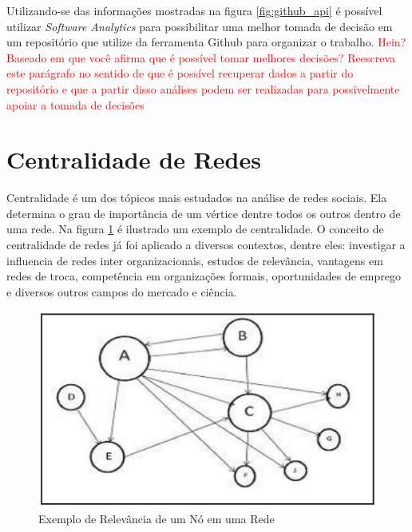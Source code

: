 Utilizando-se das informações mostradas na figura \ref{fig:github_api} é possível utilizar \textit{Software Analytics} para possibilitar uma melhor tomada de decisão em um repositório que utilize da ferramenta Github para organizar o trabalho. \textcolor{red}{Hein? Baseado em que você afirma que é possível tomar melhores decisões? Reescreva este parágrafo no sentido de que é possível recuperar dados a partir do repositório e que a partir disso análises podem ser realizadas para possivelmente apoiar a tomada de decisões}

\section{Centralidade de Redes}
\label{ref:cen}
Centralidade é um dos tópicos mais estudados na análise de redes sociais. Ela determina o grau de importância de um vértice dentre todos os outros dentro de uma rede. Na figura \ref{fig:centrality} é ilustrado um exemplo de centralidade. 
O conceito de centralidade de redes já foi aplicado a diversos contextos, dentre eles: investigar a influencia de redes inter organizacionais, estudos de relevância, vantagens em redes de troca, competência em organizações formais, oportunidades de emprego e diversos outros campos 
do mercado e ciência\cite{centrality}.


\begin{figure}[h]
    \centering
        \includegraphics[keepaspectratio=true,scale=0.5]{figuras/centrality.eps}
    \caption{Exemplo de Relevância de um Nó em uma Rede}
    \label{fig:centrality}
\end{figure}

